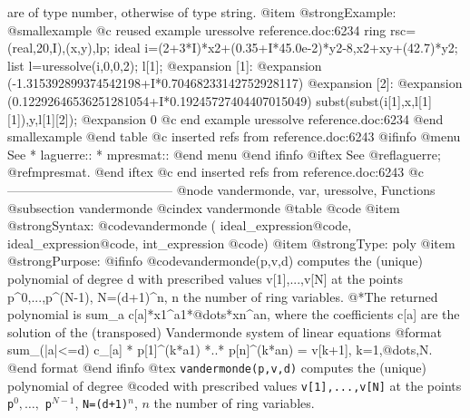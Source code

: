 {{{{{{{are of type number, otherwise of type string.
@item @strong{Example:}
@smallexample
@c reused example uressolve reference.doc:6234 
ring rsc=(real,20,I),(x,y),lp;
ideal i=(2+3*I)*x2+(0.35+I*45.0e-2)*y2-8,x2+xy+(42.7)*y2;
list l=uressolve(i,0,0,2);
l[1];
@expansion{} [1]:
@expansion{}    (-1.315392899374542198+I*0.70468233142752928117)
@expansion{} [2]:
@expansion{}    (0.12292646536251281054+I*0.19245727404407015049)
subst(subst(i[1],x,l[1][1]),y,l[1][2]);
@expansion{} 0
@c end example uressolve reference.doc:6234
@end smallexample
@end table
@c inserted refs from reference.doc:6243
@ifinfo
@menu
See
* laguerre::
* mpresmat::
@end menu
@end ifinfo
@iftex
See
@ref{laguerre};
@ref{mpresmat}.
@end iftex
@c end inserted refs from reference.doc:6243
@c ---------------------------------------
@node vandermonde, var, uressolve, Functions
@subsection vandermonde
@cindex vandermonde
@table @code
@item @strong{Syntax:}
@code{vandermonde (} ideal_expression@code{,} ideal_expression@code{,}
int_expression @code{)}
@item @strong{Type:}
poly
@item @strong{Purpose:}
@ifinfo
@code{vandermonde(p,v,d)} computes the (unique) polynomial of degree
d with prescribed values v[1],...,v[N] at the points
p^0,...,p^(N-1), N=(d+1)^n, n the number of ring
variables.
@*The returned polynomial is sum_a c[a]*x1^a1*@dots{}*xn^an,
where the coefficients c[a] are the solution of the (transposed)
Vandermonde system of linear equations
@format
   sum_(|a|<=d) c_[a] * p[1]^(k*a1) *..* p[n]^(k*an) = v[k+1],
k=1,@dots{},N.
@end format
@end ifinfo
@tex
{\tt vandermonde(p,v,d)} computes the (unique) polynomial of degree
@code{d} with prescribed values {\tt v[1],...,v[N]} at the points
{\tt p}$^0,\dots,$ {\tt p}$^{N-1}$, {\tt N=(d+1)}$^n$, $n$ the
number of ring variables.

}}}}}}}
